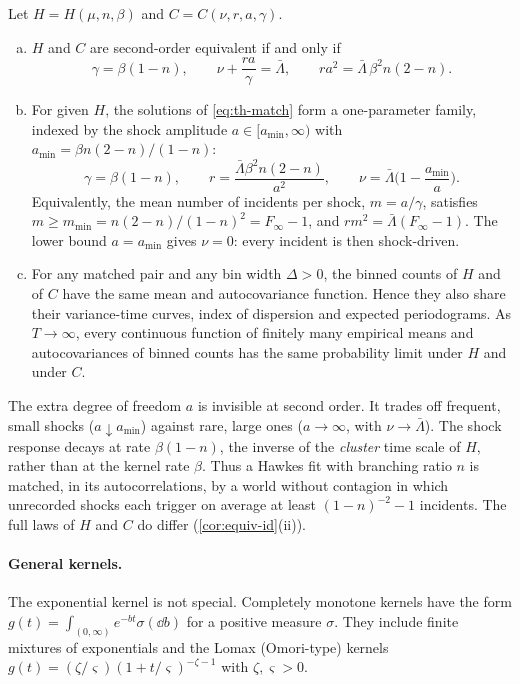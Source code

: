 \begin{theorem}\label{thm:equiv}
Let $H=H(\mu,n,\beta)$ and $C=C(\nu,r,a,\gamma)$.
\begin{enumerate}[(a)]
  \item $H$ and $C$ are second-order equivalent if and only if
  \begin{equation}\label{eq:th-match}
    \gamma=\beta(1-n),\qquad \nu+\frac{r a}{\gamma}=\bar\Lambda,\qquad
    r a^2=\bar\Lambda\,\beta^2 n(2-n).
  \end{equation}
  \item For given $H$, the solutions of \eqref{eq:th-match} form a one-parameter
  family, indexed by the shock amplitude $a\in[a_{\min},\infty)$ with
  $a_{\min}=\beta n(2-n)/(1-n)$:
  \[
    \gamma=\beta(1-n),\qquad
    r=\frac{\bar\Lambda\beta^2 n(2-n)}{a^2},\qquad
    \nu=\bar\Lambda\Big(1-\frac{a_{\min}}{a}\Big).
  \]
  Equivalently, the mean number of incidents per shock, $m=a/\gamma$, satisfies
  $m\ge m_{\min}=n(2-n)/(1-n)^2=F_\infty-1$, and $r m^2=\bar\Lambda(F_\infty-1)$.
  The lower bound $a=a_{\min}$ gives $\nu=0$: every incident is then shock-driven.
  \item For any matched pair and any bin width $\Delta>0$, the binned counts of $H$
  and of $C$ have the same mean and autocovariance function. Hence they also share
  their variance-time curves, index of dispersion and expected periodograms. As
  $T\to\infty$, every continuous function of finitely many empirical means and
  autocovariances of binned counts has the same probability limit under $H$ and
  under $C$.
\end{enumerate}
\end{theorem}

The extra degree of freedom $a$ is invisible at second order. It trades off frequent,
small shocks ($a\downarrow a_{\min}$) against rare, large ones ($a\to\infty$, with
$\nu\to\bar\Lambda$). The shock response decays at rate $\beta(1-n)$, the inverse
of the \emph{cluster} time scale of $H$, rather than at the kernel rate $\beta$. Thus a
Hawkes
fit with branching ratio $n$ is matched, in its autocorrelations, by a world without
contagion in which unrecorded shocks each trigger on average at least
$(1-n)^{-2}-1$ incidents. The full laws of $H$ and $C$ do differ
(\cref{cor:equiv-id}(ii)).

\paragraph{General kernels.} The exponential kernel is not special. Completely monotone
kernels have the form $g(t)=\int_{(0,\infty)}e^{-bt}\sigma(\dd b)$ for a positive
measure $\sigma$. They include finite mixtures of exponentials and the Lomax (Omori-type) kernels
$g(t)=(\zeta/\varsigma)(1+t/\varsigma)^{-\zeta-1}$ with
$\zeta,\varsigma>0$.

